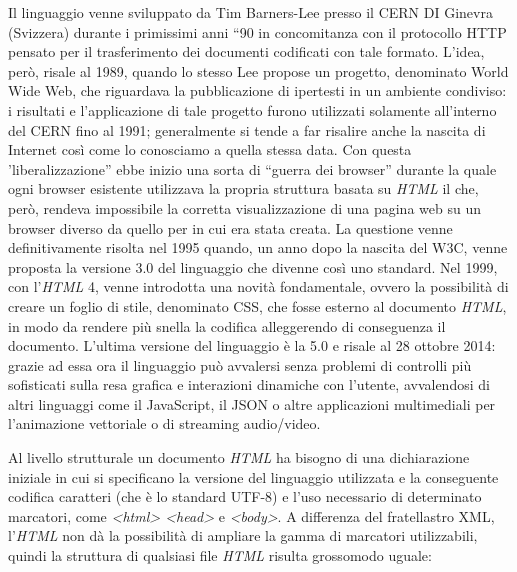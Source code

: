 \documentclass[
  b5paper,
  twoside,
  11pt,
  chapterprefix=false,
  bibliography=totocnumbered,
  parskip=0]{scrbook}
\begin{document}
Il linguaggio venne sviluppato da Tim Barners-Lee presso il CERN DI
Ginevra (Svizzera) durante i primissimi anni \enquote{90 in concomitanza con il
protocollo HTTP pensato per il trasferimento dei documenti codificati
con tale formato. L'idea, però, risale al 1989, quando lo stesso Lee
propose un progetto, denominato World Wide Web, che riguardava la
pubblicazione di ipertesti in un ambiente condiviso: i risultati e
l'applicazione di tale progetto furono utilizzati solamente all'interno
del CERN fino al 1991; generalmente si tende a far risalire anche la
nascita di Internet così come lo conosciamo a quella stessa data. Con
questa 'liberalizzazione} ebbe inizio una sorta di \enquote{guerra dei browser}
durante la quale ogni browser esistente utilizzava la propria struttura
basata su \emph{HTML} il che, però, rendeva impossibile la corretta
visualizzazione di una pagina web su un browser diverso da quello per in
cui era stata creata. La questione venne definitivamente risolta nel
1995 quando, un anno dopo la nascita del W3C, venne proposta la versione
3.0 del linguaggio che divenne così uno standard. Nel 1999, con l'\emph{HTML}
4, venne introdotta una novità fondamentale, ovvero la possibilità di
creare un foglio di stile, denominato CSS, che fosse esterno al
documento \emph{HTML}, in modo da rendere più snella la codifica alleggerendo
di conseguenza il documento. L'ultima versione del linguaggio è la 5.0 e
risale al 28 ottobre 2014: grazie ad essa ora il linguaggio può
avvalersi senza problemi di controlli più sofisticati sulla resa grafica
e interazioni dinamiche con l'utente, avvalendosi di altri linguaggi
come il JavaScript, il JSON o altre applicazioni multimediali per
l'animazione vettoriale o di streaming audio/video.

Al livello strutturale un documento \emph{HTML} ha bisogno di una
dichiarazione iniziale in cui si specificano la versione del linguaggio
utilizzata e la conseguente codifica caratteri (che è lo standard UTF-8)
e l'uso necessario di determinato marcatori, come \emph{\textless html\textgreater{} \textless head\textgreater{}} e
\emph{\textless body\textgreater{}}. A differenza del fratellastro XML, l'\emph{HTML} non dà la
possibilità di ampliare la gamma di marcatori utilizzabili, quindi la
struttura di qualsiasi file \emph{HTML} risulta grossomodo uguale:
\end{document}
